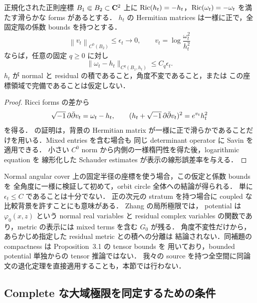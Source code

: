 \begin{proposition}[比較背景の積分離を仮定しない局所安定性]
\label{neck:prop:small-density-coupled}
正規化された正則座標 $B_1\Subset B_2\subset\mathbf C^2$ 上に
$\operatorname{Ric}(h_t)=-h_t$，$\operatorname{Ric}(\omega_t)=-\omega_t$ を満たす滑らかな forms があるとする．
$h_t$ の Hermitian matrices は一様に正で，全固定階の係数 bounds を持つとする．
\begin{equation}\label{neck:eq:small-density-coupled}
 \left\|v_t\right\|_{C^0(B_2)}\le\epsilon_t\longrightarrow0,
 \qquad v_t=\log\frac{\omega_t^2}{h_t^2}
\end{equation}
ならば，任意の固定 $q\ge0$ に対し
\[
 \|\omega_t-h_t\|_{C^q(B_1,h_t)}\le C_q\epsilon_t.
\]
$h_t$ が normal と residual の積であること，角度不変であること，または
この座標領域で完備であることは仮定しない．
\end{proposition}

\begin{proof}
Ricci forms の差から
\[
 \sqrt{-1}\,\partial\bar\partial v_t=\omega_t-h_t,\qquad
 (h_t+\sqrt{-1}\,\partial\bar\partial v_t)^2=e^{v_t}h_t^2
\]
を得る． の証明は，背景の Hermitian
matrix が一様に正で滑らかであることだけを用いる．Mixed entries を含む場合も
同じ determinant operator に Savin\cite[Theorem~1.3]{SavinSmall} を適用できる．
小さい $C^0$ norm から内側の一様楕円性を得た後，logarithmic equation を
線形化した Schauder estimates が表示の線形誤差率を与える．
\end{proof}

Normal angular cover 上の固定半径の座標を使う場合，この仮定と係数 bounds を
全角度に一様に検証して初めて，orbit circle 全体への結論が得られる．
単に $\epsilon_t\le C$ であることは十分でない．
正の次元の stratum を持つ場合に coupled な比較背景を許すことにも意味がある．
Zhang\cite[Lemma~3.3, equations~(3.10)--(3.12)]{ZhangNegativeKE} の局所極限では，
potential は $\varphi_0(x,z)$ という normal real variables と residual complex
variables の関数であり，metric の表示には mixed terms を含む $G_0$ が残る．
角度不変性だけから，あらかじめ指定した residual metric との積への分離は
結論されない．同補題の compactness は Proposition~3.1 の tensor bounds を
用いており，bounded potential 単独からの tensor 推論ではない．
我々の source を持つ全空間に同論文の退化定理を直接適用することも，本節では行わない．

\subsection{Complete な大域極限を同定するための条件}

